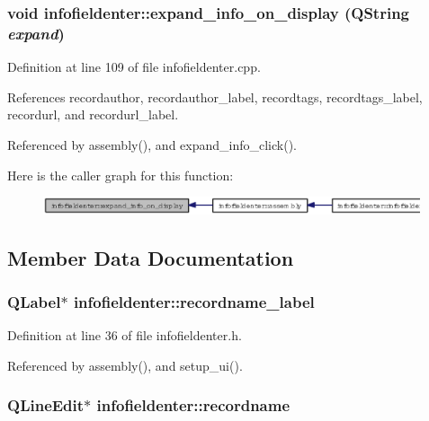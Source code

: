 \subsubsection{\setlength{\rightskip}{0pt plus 5cm}void infofieldenter::expand\_\-info\_\-on\_\-display (QString {\em expand})\hspace{0.3cm}{\tt  [private]}}\label{classinfofieldenter_1293795de93ff8d6810a658e80e15069}




Definition at line 109 of file infofieldenter.cpp.

References recordauthor, recordauthor\_\-label, recordtags, recordtags\_\-label, recordurl, and recordurl\_\-label.

Referenced by assembly(), and expand\_\-info\_\-click().

Here is the caller graph for this function:\begin{figure}[H]
\begin{center}
\leavevmode
\includegraphics[width=314pt]{classinfofieldenter_1293795de93ff8d6810a658e80e15069_icgraph}
\end{center}
\end{figure}


\subsection{Member Data Documentation}
\subsubsection{\setlength{\rightskip}{0pt plus 5cm}QLabel$\ast$ {\bf infofieldenter::recordname\_\-label}\hspace{0.3cm}{\tt  [private]}}\label{classinfofieldenter_5d482d92e5efc647a4e022ade9899ead}




Definition at line 36 of file infofieldenter.h.

Referenced by assembly(), and setup\_\-ui().
\subsubsection{\setlength{\rightskip}{0pt plus 5cm}QLine\-Edit$\ast$ {\bf infofieldenter::recordname}\hspace{0.3cm}{\tt  [private]}}\label{classinfofieldenter_7af2f90d29958f18b4f31281e3f11e3c}




